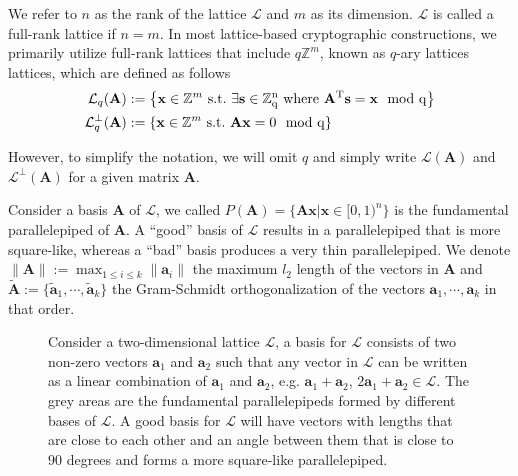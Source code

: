 \documentclass[cryptography,review,submit,pdftex,moreauthors,amsmath,amssymb,aps,strict]{Definitions/mdpi}
\begin{document}
We refer to $n$ as the rank of the lattice $\mathcal{L}$ and $m$ as its dimension. $\mathcal{L}$ is called a full-rank lattice if $n=m$. In most lattice-based cryptographic constructions, we primarily utilize full-rank lattices that include $q\mathbb{Z}^m$, known as $q$-ary lattices lattices, which are defined as follows 
\begin{align}
\mathcal{L}_q(\mathbf{A}) &:= \left\{ \mathbf{x}\in\mathbb{Z}^m ~\rm{s.t.}~\exists \mathbf{s}\in\mathbb{Z}_q^n~\rm{where}~\mathbf{A}^T\mathbf{s}=\mathbf{x}\mod q \right\}\\
\mathcal{L}^{\perp}_q(\mathbf{A}) &:= \left\{  \mathbf{x}\in\mathbb{Z}^m~\rm{s.t.}~\mathbf{A}\mathbf{x}=0\mod q \right\} 
\end{align}

However, to simplify the notation, we will omit $q$ and simply write $\mathcal{L}(\mathbf{A})$ and $\mathcal{L}^{\perp}(\mathbf{A})$ for a given matrix $\mathbf{A}$. 


Consider a basis $\mathbf{A}$ of $\mathcal{L}$, we called $P(\mathbf{A})=\{\mathbf{A}\mathbf{x}|\mathbf{x}\in[0,1)^n\}$ is the fundamental parallelepiped of $\mathbf{A}$. A ``good'' basis of $\mathcal{L}$ results in a parallelepiped that is more square-like, whereas a ``bad'' basis produces a very thin parallelepiped. We denote$\|\mathbf{A}\|:=\max_{1 \le i \le k} \|\mathbf{a}_i\|$ the maximum $l_2$ length of the vectors in $\mathbf{A}$ and $\tilde{\mathbf{A}}:=\{\tilde{\mathbf{a}}_1,\cdots,\tilde{\mathbf{a}}_k \}$ the Gram-Schmidt orthogonalization of the vectors $\mathbf{a}_1,\cdots,\mathbf{a}_k$ in that order.


\begin{figure}[!htb]
    \centering
        
    \caption{Consider a two-dimensional lattice $\mathcal{L}$, a basis for $\mathcal{L}$ consists of two non-zero vectors $\mathbf{a}_1$ and  $\mathbf{a}_2$ such that any vector in $\mathcal{L}$ can be written as a linear combination of $\mathbf{a}_1$ and $\mathbf{a}_2$, e.g. $\mathbf{a}_1+\mathbf{a}_2$, $2\mathbf{a}_1+\mathbf{a}_2\in \mathcal{L}$. The grey areas are the fundamental parallelepipeds formed by different bases of $\mathcal{L}$. A good basis for $\mathcal{L}$ will have vectors with lengths that are close to each other and an angle between them that is close to $90$ degrees and forms a more square-like parallelepiped.}
    \label{fig:lattice_basis}
\end{figure}
\end{document}
